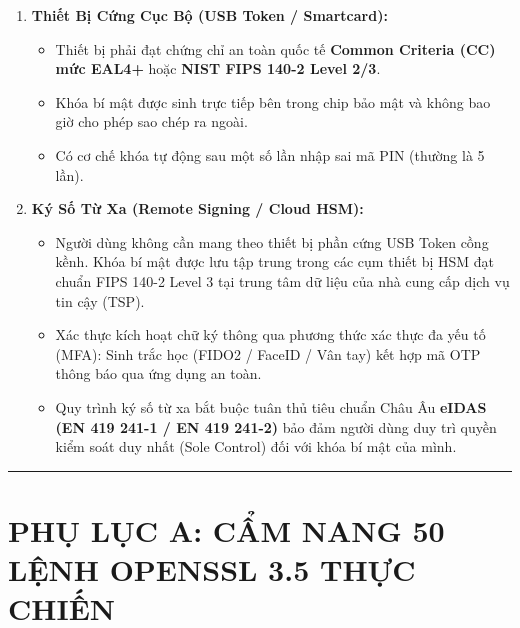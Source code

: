 \documentclass[
]{article}
\providecommand{\tightlist}{%
  \setlength{\itemsep}{0pt}\setlength{\parskip}{0pt}}
\begin{document}
\begin{enumerate}
\def\labelenumi{\arabic{enumi}.}
\tightlist
\item
  \textbf{Thiết Bị Cứng Cục Bộ (USB Token / Smartcard):}

  \begin{itemize}
  \tightlist
  \item
    Thiết bị phải đạt chứng chỉ an toàn quốc tế \textbf{Common Criteria
    (CC) mức EAL4+} hoặc \textbf{NIST FIPS 140-2 Level 2/3}.
  \item
    Khóa bí mật được sinh trực tiếp bên trong chip bảo mật và không bao
    giờ cho phép sao chép ra ngoài.
  \item
    Có cơ chế khóa tự động sau một số lần nhập sai mã PIN (thường là 5
    lần).
  \end{itemize}
\item
  \textbf{Ký Số Từ Xa (Remote Signing / Cloud HSM):}

  \begin{itemize}
  \tightlist
  \item
    Người dùng không cần mang theo thiết bị phần cứng USB Token cồng
    kềnh. Khóa bí mật được lưu tập trung trong các cụm thiết bị HSM đạt
    chuẩn FIPS 140-2 Level 3 tại trung tâm dữ liệu của nhà cung cấp dịch
    vụ tin cậy (TSP).
  \item
    Xác thực kích hoạt chữ ký thông qua phương thức xác thực đa yếu tố
    (MFA): Sinh trắc học (FIDO2 / FaceID / Vân tay) kết hợp mã OTP thông
    báo qua ứng dụng an toàn.
  \item
    Quy trình ký số từ xa bắt buộc tuân thủ tiêu chuẩn Châu Âu
    \textbf{eIDAS (EN 419 241-1 / EN 419 241-2)} bảo đảm người dùng duy
    trì quyền kiểm soát duy nhất (Sole Control) đối với khóa bí mật của
    mình.
  \end{itemize}
\end{enumerate}

\begin{center}\rule{0.5\linewidth}{0.5pt}\end{center}

\section{PHỤ LỤC A: CẨM NANG 50 LỆNH OPENSSL 3.5 THỰC
CHIẾN}\label{phux1ee5-lux1ee5c-a-cux1ea9m-nang-50-lux1ec7nh-openssl-3.5-thux1ef1c-chiux1ebfn}
\end{document}
